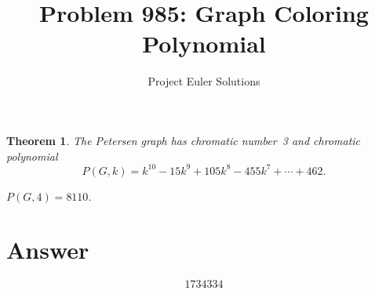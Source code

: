 \documentclass[11pt]{article}
\title{Problem 985: Graph Coloring Polynomial}
\author{Project Euler Solutions}
\date{}
\newtheorem{theorem}{Theorem}
\begin{document}
\maketitle
\begin{theorem}
The Petersen graph has chromatic number~3 and chromatic polynomial
\[P(G,k) = k^{10}-15k^9+105k^8-455k^7+\cdots+462.\]
\end{theorem}
$P(G,4) = 8110$.
\section{Answer}

\[
\boxed{1734334}
\]
\end{document}
